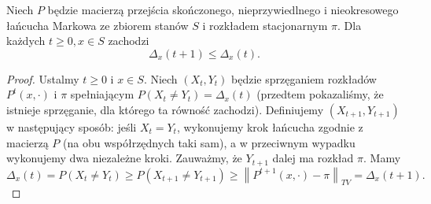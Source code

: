 \begin{lemma}[O monotoniczności]
   Niech \(P\) będzie macierzą przejścia skończonego, nieprzywiedlnego i nieokresowego łańcucha Markowa ze zbiorem stanów \(S\) i rozkładem stacjonarnym \(\pi\). Dla każdych \(t\ge 0, x \in S\) zachodzi
   \[ \Delta_x\left( t+1 \right) \le \Delta_x\left( t  \right) . \] 
\end{lemma}
\begin{proof}
    Ustalmy \(t\ge 0\) i \(x \in S\). Niech \(\left( X_t,Y_t \right) \) będzie sprzęganiem rozkładów \(P^{t}\left( x,\cdot  \right) \) i \(\pi\) spełniającym \(P\left( X_t \neq Y_t \right) = \Delta_x\left( t  \right) \) (przedtem pokazaliśmy, że istnieje sprzęganie, dla którego ta równość zachodzi). Definiujemy \(\left( X_{t+1},Y_{t+1} \right) \) w następujący sposób: jeśli \(X_t = Y_t\), wykonujemy krok łańcucha zgodnie z macierzą \(P\) (na obu współrzędnych taki sam), a w przeciwnym wypadku wykonujemy dwa niezależne kroki. Zauważmy, że \(Y_{t+1}\) dalej ma rozkład \(\pi\). Mamy
    \[ \Delta_x\left( t  \right) = P\left( X_t \neq Y_t \right) \ge P\left( X_{t+1}\neq Y_{t+1} \right) \ge \left\|P^{t+1}\left( x,\cdot  \right) - \pi \right\|_{TV} = \Delta_x\left( t+1 \right) . \] 
\end{proof}

